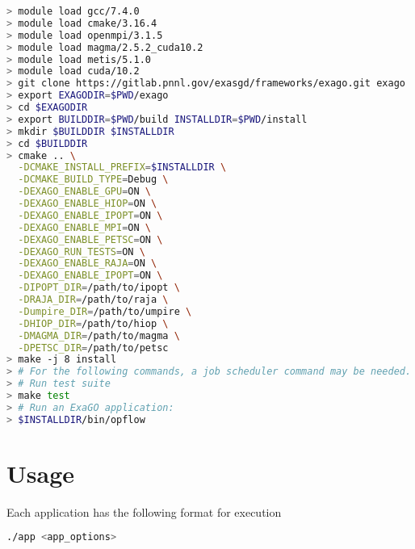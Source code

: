 \begin{lstlisting}[language=bash,caption={\exago build with all options enabled}]
> module load gcc/7.4.0
> module load cmake/3.16.4
> module load openmpi/3.1.5
> module load magma/2.5.2_cuda10.2
> module load metis/5.1.0
> module load cuda/10.2
> git clone https://gitlab.pnnl.gov/exasgd/frameworks/exago.git exago
> export EXAGODIR=$PWD/exago
> cd $EXAGODIR
> export BUILDDIR=$PWD/build INSTALLDIR=$PWD/install
> mkdir $BUILDDIR $INSTALLDIR
> cd $BUILDDIR
> cmake .. \
  -DCMAKE_INSTALL_PREFIX=$INSTALLDIR \
  -DCMAKE_BUILD_TYPE=Debug \
  -DEXAGO_ENABLE_GPU=ON \
  -DEXAGO_ENABLE_HIOP=ON \
  -DEXAGO_ENABLE_IPOPT=ON \
  -DEXAGO_ENABLE_MPI=ON \
  -DEXAGO_ENABLE_PETSC=ON \
  -DEXAGO_RUN_TESTS=ON \
  -DEXAGO_ENABLE_RAJA=ON \
  -DEXAGO_ENABLE_IPOPT=ON \
  -DIPOPT_DIR=/path/to/ipopt \
  -DRAJA_DIR=/path/to/raja \
  -Dumpire_DIR=/path/to/umpire \
  -DHIOP_DIR=/path/to/hiop \
  -DMAGMA_DIR=/path/to/magma \
  -DPETSC_DIR=/path/to/petsc
> make -j 8 install
> # For the following commands, a job scheduler command may be needed.
> # Run test suite
> make test
> # Run an ExaGO application:
> $INSTALLDIR/bin/opflow
\end{lstlisting}

\section{Usage}

Each \exago application has the following format for execution
\begin{lstlisting}[language=bash]
  ./app <app_options>
\end{lstlisting}

